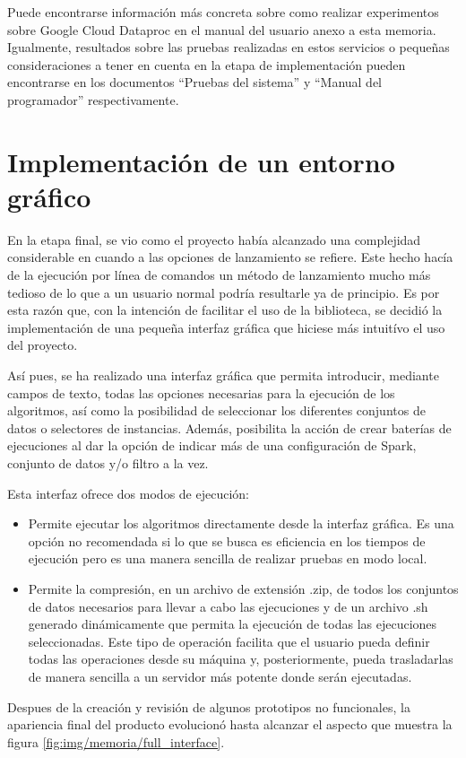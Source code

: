 Puede encontrarse información más concreta sobre como realizar experimentos sobre Google Cloud Dataproc en el manual del usuario anexo a esta memoria. Igualmente, resultados sobre las pruebas realizadas en estos servicios o pequeñas consideraciones a tener en cuenta en la etapa de implementación pueden encontrarse en los documentos ``Pruebas del sistema'' y ``Manual del programador'' respectivamente. 

\section{Implementación de un entorno gráfico}

En la etapa final, se vio como el proyecto había alcanzado una complejidad considerable en cuando a las opciones de lanzamiento se refiere. Este hecho hacía de la ejecución por línea de comandos un método de lanzamiento mucho más tedioso de lo que a un usuario normal podría resultarle ya de principio. Es por esta razón que, con la intención de facilitar el uso de la biblioteca, se decidió la implementación de una pequeña interfaz gráfica que hiciese más intuitívo el uso del proyecto.

Así pues, se ha realizado una interfaz gráfica que permita introducir, mediante campos de texto, todas las opciones necesarias para la ejecución de los algoritmos, así como la posibilidad de seleccionar los diferentes conjuntos de datos o selectores de instancias. Además, posibilita la acción de crear baterías de ejecuciones al dar la opción de indicar más de una configuración de Spark, conjunto de datos y/o filtro a la vez.

Esta interfaz ofrece dos modos de ejecución:

\begin{itemize}
\item Permite ejecutar los algoritmos directamente desde la interfaz gráfica. Es una opción no recomendada si lo que se busca es eficiencia en los tiempos de ejecución pero es una manera sencilla de realizar pruebas en modo local.
\item Permite la compresión, en un archivo de extensión .zip, de todos los conjuntos de datos necesarios para llevar a cabo las ejecuciones y de un archivo .sh generado dinámicamente que permita la ejecución de todas las ejecuciones seleccionadas. Este tipo de operación facilita que el usuario pueda definir todas las operaciones desde su máquina y, posteriormente, pueda trasladarlas de manera sencilla a un servidor más potente donde serán ejecutadas.
\end{itemize}

Despues de la creación y revisión de algunos prototipos no funcionales, la apariencia final del producto evolucionó hasta alcanzar el aspecto que muestra la figura \ref{fig:img/memoria/full_interface}.


